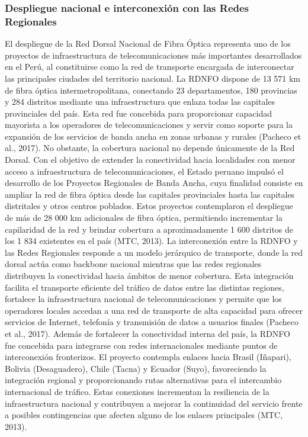 \subsubsection{Despliegue nacional e interconexión con las Redes Regionales}
El despliegue de la Red Dorsal Nacional de Fibra Óptica representa uno de los proyectos de infraestructura de telecomunicaciones más importantes desarrollados en el Perú, al constituirse como la red de transporte encargada de interconectar las principales ciudades del territorio nacional. La RDNFO dispone de 13 571 km de fibra óptica intermetropolitana, conectando 23 departamentos, 180 provincias y 284 distritos mediante una infraestructura que enlaza todas las capitales provinciales del país. Esta red fue concebida para proporcionar capacidad mayorista a los operadores de telecomunicaciones y servir como soporte para la expansión de los servicios de banda ancha en zonas urbanas y rurales (Pacheco et al., 2017). 
No obstante, la cobertura nacional no depende únicamente de la Red Dorsal. Con el objetivo de extender la conectividad hacia localidades con menor acceso a infraestructura de telecomunicaciones, el Estado peruano impulsó el desarrollo de los Proyectos Regionales de Banda Ancha, cuya finalidad consiste en ampliar la red de fibra óptica desde las capitales provinciales hasta las capitales distritales y otros centros poblados. Estos proyectos contemplaron el despliegue de más de 28 000 km adicionales de fibra óptica, permitiendo incrementar la capilaridad de la red y brindar cobertura a aproximadamente 1 600 distritos de los 1 834 existentes en el país (MTC, 2013). 
La interconexión entre la RDNFO y las Redes Regionales responde a un modelo jerárquico de transporte, donde la red dorsal actúa como backbone nacional mientras que las redes regionales distribuyen la conectividad hacia ámbitos de menor cobertura. Esta integración facilita el transporte eficiente del tráfico de datos entre las distintas regiones, fortalece la infraestructura nacional de telecomunicaciones y permite que los operadores locales accedan a una red de transporte de alta capacidad para ofrecer servicios de Internet, telefonía y transmisión de datos a usuarios finales (Pacheco et al., 2017). 
Además de fortalecer la conectividad interna del país, la RDNFO fue concebida para integrarse con redes internacionales mediante puntos de interconexión fronterizos. El proyecto contempla enlaces hacia Brasil (Iñapari), Bolivia (Desaguadero), Chile (Tacna) y Ecuador (Suyo), favoreciendo la integración regional y proporcionando rutas alternativas para el intercambio internacional de tráfico. Estas conexiones incrementan la resiliencia de la infraestructura nacional y contribuyen a mejorar la continuidad del servicio frente a posibles contingencias que afecten alguno de los enlaces principales (MTC, 2013).

